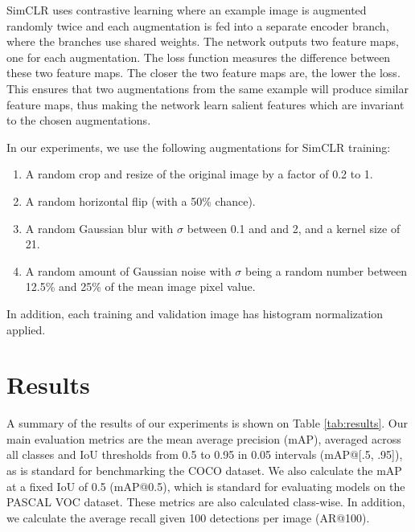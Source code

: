 \documentclass[conference]{IEEEtran}
\begin{document}
SimCLR uses contrastive learning where an example image is augmented randomly twice and each augmentation is fed into a separate encoder branch, where the branches use shared weights. The network outputs two feature maps, one for each augmentation. The loss function measures the difference between these two feature maps. The closer the two feature maps are, the lower the loss. This ensures that two augmentations from the same example will produce similar feature maps, thus making the network learn salient features which are invariant to the chosen augmentations.

In our experiments, we use the following augmentations for SimCLR training:

\begin{enumerate}
\item A random crop and resize of the original image by a factor of 0.2 to 1.
\item A random horizontal flip (with a 50\% chance).
\item A random Gaussian blur with $\sigma$ between 0.1 and and 2, and a kernel size of 21.
\item A random amount of Gaussian noise with $\sigma$ being a random number between 12.5\% and 25\% of the mean image pixel value.
\end{enumerate}

In addition, each training and validation image has histogram normalization applied.

\section{Results}\label{sec2}

A summary of the results of our experiments is shown on Table \ref{tab:results}. Our main evaluation metrics are the mean average precision (mAP), averaged across all classes and IoU thresholds from 0.5 to 0.95 in 0.05 intervals (mAP@[.5, .95]), as is standard for benchmarking the COCO dataset. We also calculate the mAP at a fixed IoU of 0.5 (mAP@0.5), which is standard for evaluating models on the PASCAL VOC dataset. These metrics are also calculated class-wise. In addition, we calculate the average recall given 100 detections per image (AR@100).

\end{document}
